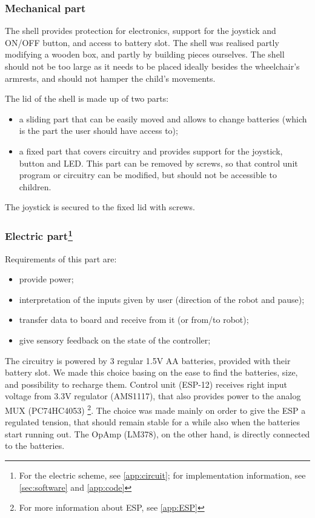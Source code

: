 \documentclass[a4paper,twoside]{book}
\begin{document}
\subsubsection{Mechanical part}

The shell provides protection for electronics, support for the joystick and ON/OFF button, and access to battery slot. The shell was realised partly modifying a wooden box, and partly by building pieces ourselves. The shell should not be too large as it needs to be placed ideally besides the wheelchair's armrests, and should not hamper the child's movements.

\beforelist The lid of the shell is made up of two parts:
\begin{itemize}
\item a sliding part that can be easily moved and allows to change batteries (which is the part the user should have access to);
\item a fixed part that covers circuitry and provides support for the joystick, button and LED. This part can be removed by screws, so that control unit program or circuitry can be modified, but should not be accessible to children.
\end{itemize}
\afterlist
The joystick is secured to the fixed lid with screws.

\subsubsection[Electric part]{Electric part\footnote{For the electric scheme, see \autoref{app:circuit}; for implementation information, see \autoref{sec:software} and \autoref{app:code}}}
\beforelist Requirements of this part are: 
\begin{itemize}
\item provide power;
\item interpretation of the inputs given by user (direction of the robot and pause);
\item transfer data to board and receive from it (or from/to robot);
\item give sensory feedback on the state of the controller;
\end{itemize}
\afterlist*
The circuitry is powered by 3 regular 1.5V AA batteries, provided with their battery slot. We made this choice basing on the ease to find the batteries, size, and possibility to recharge them. Control unit (ESP-12) receives right input voltage from 3.3V regulator (AMS1117), that also provides power to the analog MUX (PC74HC4053)%
\footnote{For more information about ESP, see \autoref{app:ESP}}.
The choice was made mainly on order to give the ESP a regulated tension, that should remain stable for a while also when the batteries start running out. The OpAmp (LM378), on the other hand, is directly connected to the batteries.
\end{document}
